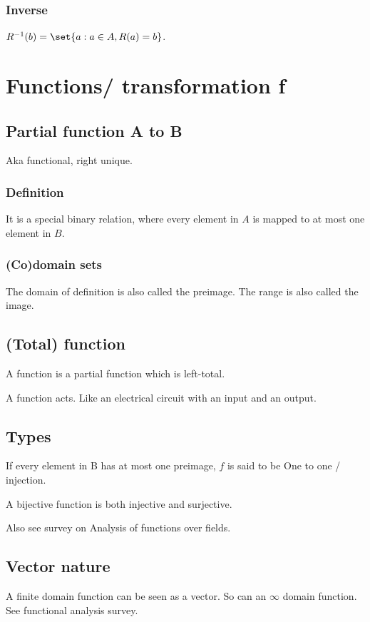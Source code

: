 \documentclass[oneside, article]{memoir}
\begin{document}
\subsubsection{Inverse}
$R^{-1}(b) = \set{a: a\in A, R(a) = b}$.

\section{Functions/ transformation f}
\subsection{Partial function A to B}
Aka functional, right unique.

\subsubsection{Definition}
It is a special binary relation, where every element in $A$ is mapped to at most one element in $B$.

\subsubsection{(Co)domain sets}
The domain of definition is also called the preimage. The range is also called the image.

\subsection{(Total) function}
A function is a partial function which is left-total.

A function acts. Like an electrical circuit with an input and an output.

\subsection{Types}
If every element in B has at most one preimage, $f$ is said to be One to one / injection.

A bijective function is both injective and surjective.

Also see survey on Analysis of functions over fields.

\subsection{Vector nature}
A finite domain function can be seen as a vector. So can an $\infty$ domain function. See functional analysis survey.
\end{document}
